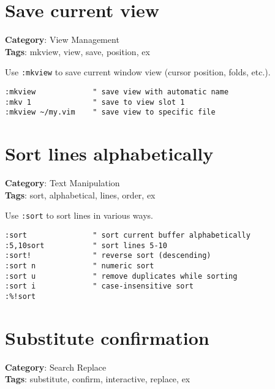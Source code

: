 {{{{{\section{Save current view}

\textbf{Category}: View Management\\ \textbf{Tags}: mkview, view, save, position, ex
\vspace{0.5cm}

Use {\footnotesize \Verb§:mkview§} to save current window view (cursor position, folds, etc.).

\begin{Exa*}{}
\begin{Verbatim}[fontsize=\footnotesize, breaklines, breakanywhere]
:mkview             " save view with automatic name
:mkv 1              " save to view slot 1
:mkview ~/my.vim    " save view to specific file
\end{Verbatim}
\end{Exa*}

\section{Sort lines alphabetically}

\textbf{Category}: Text Manipulation\\ \textbf{Tags}: sort, alphabetical, lines, order, ex
\vspace{0.5cm}

Use {\footnotesize \Verb§:sort§} to sort lines in various ways.

\begin{Exa*}{}
\begin{Verbatim}[fontsize=\footnotesize, breaklines, breakanywhere]
:sort               " sort current buffer alphabetically
:5,10sort           " sort lines 5-10
:sort!              " reverse sort (descending)
:sort n             " numeric sort
:sort u             " remove duplicates while sorting
:sort i             " case-insensitive sort
:%!sort
\end{Verbatim}
\end{Exa*}

\section{Substitute confirmation}

\textbf{Category}: Search Replace\\ \textbf{Tags}: substitute, confirm, interactive, replace, ex
\vspace{0.5cm}

}}}}}
